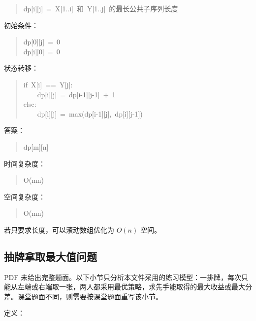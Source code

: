 \documentclass[UTF8,zihao=-4]{ctexart}
\begin{document}
\begin{quote}
\small\ttfamily\raggedright
\relax dp[i][j]\ =\ X[1..i]\ 和\ Y[1..j]\ 的最长公共子序列长度\\
\end{quote}

初始条件：

\begin{quote}
\small\ttfamily\raggedright
\relax dp[0][j]\ =\ 0\\
\relax dp[i][0]\ =\ 0\\
\end{quote}

状态转移：

\begin{quote}
\small\ttfamily\raggedright
\relax if\ X[i]\ ==\ Y[j]:\\
\relax \ \ \ \ dp[i][j]\ =\ dp[i-1][j-1]\ +\ 1\\
\relax else:\\
\relax \ \ \ \ dp[i][j]\ =\ max(dp[i-1][j],\ dp[i][j-1])\\
\end{quote}

答案：

\begin{quote}
\small\ttfamily\raggedright
\relax dp[m][n]\\
\end{quote}

时间复杂度：

\begin{quote}
\small\ttfamily\raggedright
\relax O(mn)\\
\end{quote}

空间复杂度：

\begin{quote}
\small\ttfamily\raggedright
\relax O(mn)\\
\end{quote}

若只要求长度，可以滚动数组优化为 $O(n)$ 空间。

\subsection*{抽牌拿取最大值问题}

PDF 未给出完整题面。以下小节只分析本文件采用的练习模型：一排牌，每次只能从左端或右端取一张，两人都采用最优策略，求先手能取得的最大收益或最大分差。课堂题面不同，则需要按课堂题面重写该小节。

定义：
\end{document}

